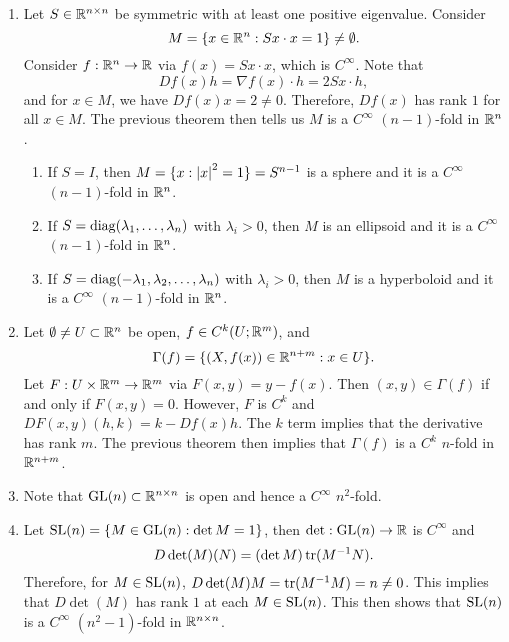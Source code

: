 \documentclass[a4paper]{article}
\begin{document}
\begin{eg}
\begin{enumerate}
\item Let $S \in \mathbb{R}^{n \times n}$ be symmetric with at least 
one positive eigenvalue. Consider
\[
M = \{x \in \mathbb{R}^n : 
S x \cdot x = 1\} \neq \emptyset.
\]
Consider $f : \mathbb{R}^n \to \mathbb{R}$ via $f(x) = Sx \cdot x$, 
which is $C^\infty$. Note that 
\[
Df(x) h = \nabla f(x) \cdot h = 2Sx \cdot h,
\]
and for $x \in M$, we have $Df(x) x = 2 \neq 0$. 
Therefore, $Df(x)$ has rank $1$ for all $x \in M$. 
The previous theorem then tells us $M$ is a $C^\infty$
$(n-1)$-fold in $\mathbb{R}^n$.

\begin{enumerate}
  \item If $S = I$, then 
  $M = \{x : \left\lvert x\right\rvert^2 = 1\} = S^{n-1}$ is a sphere and 
  it is a $C^\infty$ $(n-1)$-fold in $\mathbb{R}^n$.

  \item If $S = \operatorname{diag}(\lambda_1, \dots, \lambda_n)$ 
  with $\lambda_i > 0$, then $M$ is an ellipsoid 
  and it is a $C^\infty$ $(n-1)$-fold in $\mathbb{R}^n$. 

  \item If $S = \operatorname{diag}(-\lambda_1, \lambda_2, \dots, \lambda_n)$
  with $\lambda_i > 0$, then $M$ is a hyperboloid and it 
  is a $C^\infty$ $(n-1)$-fold in $\mathbb{R}^n$.
\end{enumerate} 

\item Let $\emptyset \neq U \subset \mathbb{R}^n$ be open, 
$f \in C^k(U; \mathbb{R}^m)$, and 
\[
\Gamma(f) = \{(X, f(x)) \in \mathbb{R}^{n+m} : x \in U\}.
\]
Let $F : U \times \mathbb{R}^m \to \mathbb{R}^m$ via $F(x, y) = y - f(x)$.
Then $(x, y) \in \Gamma(f)$ if and only if $F(x, y) = 0$. 
However, $F$ is $C^k$ and $DF(x, y) (h, k) = k - Df(x) h$.
The $k$ term implies that the derivative has rank $m$.
The previous theorem then implies that $\Gamma(f)$ is 
a $C^k$ $n$-fold in $\mathbb{R}^{n+m}$. 

\item Note that $\mathrm{GL}(n) \subset \mathbb{R}^{n \times n}$ is open 
and hence a $C^\infty$ $n^2$-fold.

\item Let $\mathrm{SL}(n) = \{M \in \mathrm{GL}(n) : \det M = 1\}$, 
then $\det: \mathrm{GL}(n) \to \mathbb{R}$ is $C^\infty$ and 
\[
D \det(M) (N) = (\det M) \operatorname{tr}(M^{-1} N).
\]
Therefore, for $M \in \mathrm{SL}(n)$, $D \det(M) M = \operatorname{tr}(M^{-1} 
M) = n \neq 0$. This implies that $D \det(M)$ has rank 
$1$ at each $M \in \mathrm{SL}(n)$. This then shows that 
$\mathrm{SL}(n)$ is a $C^\infty$ $(n^2 - 1)$-fold in $\mathbb{R}^{n \times n}$.


\end{enumerate}
\end{eg}
\end{document}
